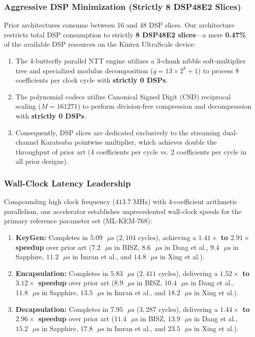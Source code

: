 \subsubsection{Aggressive DSP Minimization (Strictly 8 DSP48E2 Slices)}
Prior architectures consume between 16 and 48 DSP slices. Our architecture restricts total DSP consumption to strictly \textbf{8 DSP48E2 slices}---a mere \textbf{0.47\%} of the available DSP resources on the Kintex UltraScale device:
\begin{enumerate}
    \item The 4-butterfly parallel NTT engine utilizes a 3-chunk nibble soft-multiplier tree and specialized modulus decomposition ($q = 13 \times 2^8 + 1$) to process 8 coefficients per clock cycle with \textbf{strictly 0 DSPs}.
    \item The polynomial codecs utilize Canonical Signed Digit (CSD) reciprocal scaling ($M = 161271$) to perform division-free compression and decompression with \textbf{strictly 0 DSPs}.
    \item Consequently, DSP slices are dedicated exclusively to the streaming dual-channel Karatsuba pointwise multiplier, which achieves double the throughput of prior art (4 coefficients per cycle vs. 2 coefficients per cycle in all prior designs).
\end{enumerate}

\subsubsection{Wall-Clock Latency Leadership}
Compounding high clock frequency ($413.7\text{ MHz}$) with 4-coefficient arithmetic parallelism, our accelerator establishes unprecedented wall-clock speeds for the primary reference parameter set (ML-KEM-768):
\begin{enumerate}
    \item \textbf{KeyGen:} Completes in \textbf{$5.09\text{ }\mu\text{s}$} ($2,104\text{ cycles}$), achieving a \textbf{$1.41\times$ to $2.91\times$ speedup} over prior art ($7.2\text{ }\mu\text{s}$ in BISZ, $8.6\text{ }\mu\text{s}$ in Dang et al., $9.4\text{ }\mu\text{s}$ in Sapphire, $11.2\text{ }\mu\text{s}$ in Imran et al., and $14.8\text{ }\mu\text{s}$ in Xing et al.).
    \item \textbf{Encapsulation:} Completes in \textbf{$5.83\text{ }\mu\text{s}$} ($2,411\text{ cycles}$), delivering a \textbf{$1.52\times$ to $3.12\times$ speedup} over prior art ($8.9\text{ }\mu\text{s}$ in BISZ, $10.4\text{ }\mu\text{s}$ in Dang et al., $11.8\text{ }\mu\text{s}$ in Sapphire, $13.5\text{ }\mu\text{s}$ in Imran et al., and $18.2\text{ }\mu\text{s}$ in Xing et al.).
    \item \textbf{Decapsulation:} Completes in \textbf{$7.95\text{ }\mu\text{s}$} ($3,287\text{ cycles}$), delivering a \textbf{$1.44\times$ to $2.96\times$ speedup} over prior art ($11.4\text{ }\mu\text{s}$ in BISZ, $13.9\text{ }\mu\text{s}$ in Dang et al., $15.2\text{ }\mu\text{s}$ in Sapphire, $17.8\text{ }\mu\text{s}$ in Imran et al., and $23.5\text{ }\mu\text{s}$ in Xing et al.).
\end{enumerate}


